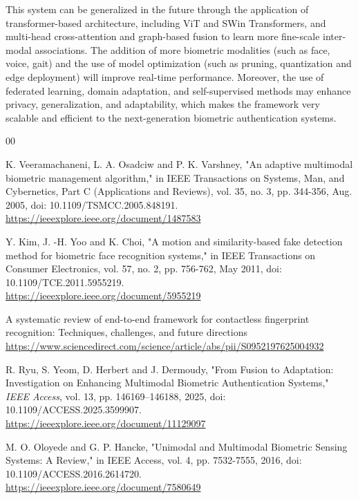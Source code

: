 \documentclass[12pt,a4paper]{report}
\begin{document}
This system can be generalized in the future through the application of transformer-based architecture, including ViT and SWin Transformers, and multi-head cross-attention and graph-based fusion to learn more fine-scale inter-modal associations. The addition of more biometric modalities (such as face, voice, gait) and the use of model optimization (such as pruning, quantization and edge deployment) will improve real-time performance. Moreover, the use of federated learning, domain adaptation, and self-supervised methods may enhance privacy, generalization, and adaptability, which makes the framework very scalable and efficient to the next-generation biometric authentication systems.


\begin{thebibliography}{00}

 K. Veeramachaneni, L. A. Osadciw and P. K. Varshney, "An adaptive multimodal biometric management algorithm," in IEEE Transactions on Systems, Man, and Cybernetics, Part C (Applications and Reviews), vol. 35, no. 3, pp. 344-356, Aug. 2005, doi: 10.1109/TSMCC.2005.848191.\\
\url{https://ieeexplore.ieee.org/document/1487583}

 Y. Kim, J. -H. Yoo and K. Choi, "A motion and similarity-based fake detection method for biometric face recognition systems," in IEEE Transactions on Consumer Electronics, vol. 57, no. 2, pp. 756-762, May 2011, doi: 10.1109/TCE.2011.5955219.\\
\url{https://ieeexplore.ieee.org/document/5955219}

 A systematic review of end-to-end framework for contactless fingerprint recognition: Techniques, challenges, and future directions \\
\url{https://www.sciencedirect.com/science/article/abs/pii/S0952197625004932}

 R. Ryu, S. Yeom, D. Herbert and J. Dermoudy, "From Fusion to Adaptation: Investigation on Enhancing Multimodal Biometric Authentication Systems," \textit{IEEE Access}, vol. 13, pp. 146169–146188, 2025, doi: 10.1109/ACCESS.2025.3599907. \\
\url{https://ieeexplore.ieee.org/document/11129097}

 M. O. Oloyede and G. P. Hancke, "Unimodal and Multimodal Biometric Sensing Systems: A Review," in IEEE Access, vol. 4, pp. 7532-7555, 2016, doi: 10.1109/ACCESS.2016.2614720. \\
\url{https://ieeexplore.ieee.org/document/7580649}


\end{thebibliography}
\end{document}
